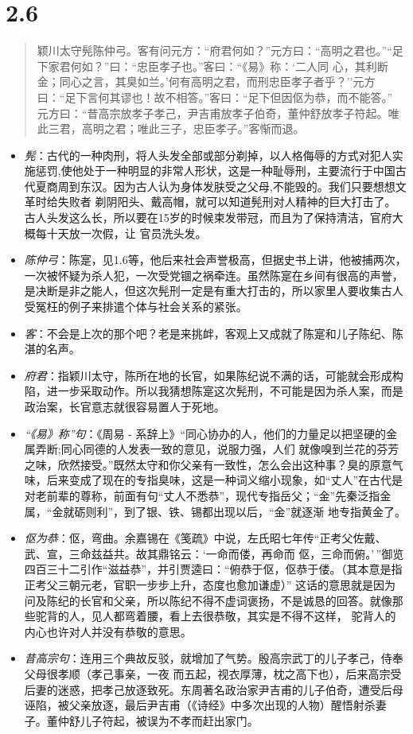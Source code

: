 \documentclass[]{book}
\providecommand{\tightlist}{%
  \setlength{\itemsep}{0pt}\setlength{\parskip}{0pt}}
\begin{document}
\section{2.6}\label{section-52}

\begin{quote}
颖川太守髡陈仲弓。客有问元方：``府君何如？''元方曰：``高明之君也。''``足下家君何如？''曰：``忠臣孝子也。''客曰：``《易》称：`二人同
心，其利断金；同心之言，其臭如兰。'何有高明之君，而刑忠臣孝子者乎？''元方曰：``足下言何其谬也！故不相答。''客曰：``足下但因伛为恭，而不能答。''
元方曰：``昔高宗放孝子孝己，尹吉甫放孝子伯奇，董仲舒放孝子符起。唯此三君，高明之君；唯此三子，忠臣孝子。''客惭而退。
\end{quote}

\begin{itemize}
\tightlist
\item
  \emph{髡}：古代的一种肉刑，将人头发全部或部分剃掉，以人格侮辱的方式对犯人实施惩罚,使他处于一种明显的非常人形状，这是一种耻辱刑，主要流行于中国古代夏商周到东汉。因为古人认为身体发肤受之父母,不能毁的。我们只要想想文革时给失败者
  剃阴阳头、戴高帽，就可以知道髡刑对人精神的巨大打击了。古人头发这么长，所以要在15岁的时候束发带冠，而且为了保持清洁，官府大概每十天放一次假，让
  官员洗头发。
\item
  \emph{陈仲弓}：陈寔，见1.6等，他后来社会声誉极高，但据史书上讲，他被捕两次，一次被怀疑为杀人犯，一次受党锢之祸牵连。虽然陈寔在乡间有很高的声誉，是决断是非之能人，但这次髡刑一定是有重大打击的，所以家里人要收集古人受冤枉的例子来排遣个体与社会关系的紧张。
\item
  \emph{客}：不会是上次的那个吧？老是来挑衅，客观上又成就了陈寔和儿子陈纪、陈湛的名声。
\item
  \emph{府君}：指颖川太守，陈所在地的长官，如果陈纪说不满的话，可能就会形成构陷，进一步采取动作。所以我猜想陈寔这次髡刑，不可能是因为杀人案，而是政治案，长官意志就很容易置人于死地。
\item
  \emph{``《易》称''句}：《周易 -
  系辞上》``同心协办的人，他们的力量足以把坚硬的金属弄断;同心同德的人发表一致的意见，说服力强，人们
  就像嗅到兰花的芬芳之味，欣然接受。''既然太守和你父亲有一致性，怎么会出这种事？臭的原意气味，后来变成了现在的专指臭味，这是一种词义缩小现象，如``丈人''在古代是对老前辈的尊称，前面有句``丈人不悉恭''，现代专指岳父；``金''先秦泛指金属，``金就砺则利''，到了银、铁、锡都出现以后，``金''就逐渐
  地专指黄金了。
\item
  \emph{伛为恭}：伛，弯曲。余嘉锡在《笺疏》中说，左氏昭七年传``正考父佐戴、武、宣，三命兹益共。故其鼎铭云：`一命而偻，再命而
  伛，三命而俯。'\,''御览四百三十二引作``滋益恭''，并引贾逵曰：``俯恭于伛，伛恭于偻。（其本意是指正考父三朝元老，官职一步步上升，态度也愈加谦虚）''
  这话的意思就是因为问及陈纪的长官和父亲，所以陈纪不得不虚词褒扬，不是诚恳的回答。就像那些驼背的人，见人都弯着腰，看上去很恭敬，其实是不得不这样，
  驼背人的内心也许对人并没有恭敬的意思。
\item
  \emph{昔高宗句}：连用三个典故反驳，就增加了气势。殷高宗武丁的儿子孝己，侍奉父母很孝顺（孝己事亲，一夜
  而五起，视衣厚薄，枕之高下也），后来高宗受后妻的迷惑，把孝己放逐致死。东周著名政治家尹吉甫的儿子伯奇，遭受后母诬陷，被父亲放逐，最后尹吉甫（《诗经》中多次出现的人物）醒悟射杀妻子。董仲舒儿子符起，被误为不孝而赶出家门。
\end{itemize}
\end{document}
